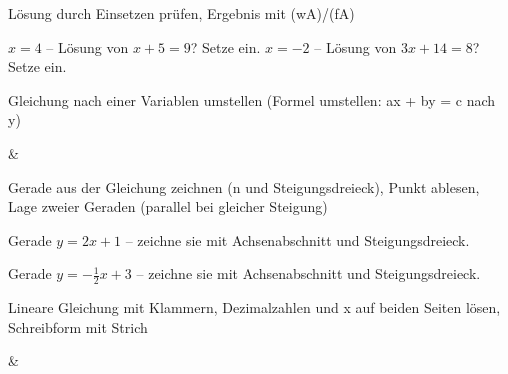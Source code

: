 \setcounter{aufgabe}{0}

\begin{aufgabe}{Lösung durch Einsetzen prüfen, Ergebnis mit (wA)/(fA)}
\begin{teile}
\teil $x = 4$ – Lösung von $x + 5 = 9$? Setze ein. \janein
\teil $x = -2$ – Lösung von $3x + 14 = 8$? Setze ein. \janein
\end{teile}
\end{aufgabe}

\begin{aufgabe}{Gleichung nach einer Variablen umstellen (Formel umstellen: ax + by = c nach y)}
\begin{gleichungsraster}[2]
 &
 \\
\end{gleichungsraster}
\end{aufgabe}

\begin{aufgabe}{Gerade aus der Gleichung zeichnen (n und Steigungsdreieck), Punkt ablesen, Lage zweier Geraden (parallel bei gleicher Steigung)}
\begin{teile}
\teil Gerade $y = 2x + 1$ – zeichne sie mit Achsenabschnitt und Steigungsdreieck.

\begin{ksys}[xmin=-5,xmax=5,ymin=-5,ymax=5] \end{ksys}
\teil Gerade $y = -\frac{1}{2}x + 3$ – zeichne sie mit Achsenabschnitt und Steigungsdreieck.

\begin{ksys}[xmin=-5,xmax=5,ymin=-5,ymax=5] \end{ksys}
\end{teile}
\end{aufgabe}

\begin{aufgabe}{Lineare Gleichung mit Klammern, Dezimalzahlen und x auf beiden Seiten lösen, Schreibform mit Strich}
\begin{gleichungsraster}[2]
 &
 \\
\end{gleichungsraster}
\end{aufgabe}

